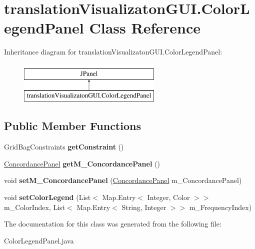 \hypertarget{classtranslation_visualizaton_g_u_i_1_1_color_legend_panel}{}\section{translation\+Visualizaton\+G\+U\+I.\+Color\+Legend\+Panel Class Reference}
\label{classtranslation_visualizaton_g_u_i_1_1_color_legend_panel}
Inheritance diagram for translation\+Visualizaton\+G\+U\+I.\+Color\+Legend\+Panel\+:\begin{figure}[H]
\begin{center}
\leavevmode
\includegraphics[height=2.000000cm]{classtranslation_visualizaton_g_u_i_1_1_color_legend_panel}
\end{center}
\end{figure}
\subsection*{Public Member Functions}
\begin{DoxyCompactItemize}
\item 
\mbox{\label{classtranslation_visualizaton_g_u_i_1_1_color_legend_panel_abafc1059179fe94a5c6064981bc6474b}} 
Grid\+Bag\+Constraints {\bfseries get\+Constraint} ()
\item 
\mbox{\label{classtranslation_visualizaton_g_u_i_1_1_color_legend_panel_ac712fb3754a75cfbc2490f0e00938c21}} 
\hyperlink{classtranslation_visualizaton_g_u_i_1_1_concordance_panel}{Concordance\+Panel} {\bfseries get\+M\+\_\+\+Concordance\+Panel} ()
\item 
\mbox{\label{classtranslation_visualizaton_g_u_i_1_1_color_legend_panel_a35ec62b52c1530439f2b27ab6f34e603}} 
void {\bfseries set\+M\+\_\+\+Concordance\+Panel} (\hyperlink{classtranslation_visualizaton_g_u_i_1_1_concordance_panel}{Concordance\+Panel} m\+\_\+\+Concordance\+Panel)
\item 
\mbox{\label{classtranslation_visualizaton_g_u_i_1_1_color_legend_panel_aa91c8659c551eba463ce5148241abf3a}} 
void {\bfseries set\+Color\+Legend} (List$<$ Map.\+Entry$<$ Integer, Color $>$$>$ m\+\_\+\+Color\+Index, List$<$ Map.\+Entry$<$ String, Integer $>$$>$ m\+\_\+\+Frequency\+Index)
\end{DoxyCompactItemize}


The documentation for this class was generated from the following file\+:\begin{DoxyCompactItemize}
\item 
Color\+Legend\+Panel.\+java\end{DoxyCompactItemize}
